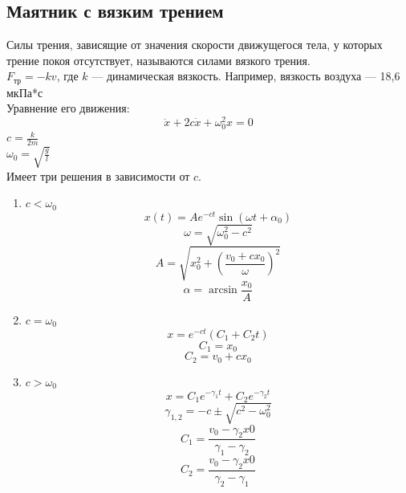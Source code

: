 \subsection*{Маятник с вязким трением}
Силы трения, зависящие от значения скорости движущегося тела, у которых трение покоя отсутствует, называются силами вязкого трения. \\
$F_{тр} = -kv$, где $k$ --- динамическая вязкость. Например, вязкость воздуха --- 18,6 мкПа*с \\
Уравнение его движения:
\begin{equation}
\ddot{x} + 2c\dot{x} + \omega_{0}^{2}x = 0
\end{equation}
$ c = \frac{k}{2m} $\\
$ \omega_{0} = \sqrt{\frac{g}{l}} $ \\
Имеет три решения в зависимости от $c$.
\begin{enumerate}
\item		$
			c < \omega_{0}
		$
		\begin{equation}
			x (t) = Ae^{-ct}\sin(\omega t + \alpha_0) 
		\end{equation}
		\begin{equation}
			\omega = \sqrt{\omega_{0}^{2} - c^2}
		\end{equation}
		\begin{equation}
			A = \sqrt{x_{0}^{2} + ({\frac{v_0 + cx_0}{\omega}})^{2}}
		\end{equation}
		\begin{equation}
			\alpha = \arcsin{\frac{x_0}{A}}
		\end{equation}
\item       
		$c = \omega_{0}$
		\begin{equation}
			x = e^{-ct}(C_1 + C_{2}t)
		\end{equation}
		\begin{equation}
			C_1 = x_0
		\end{equation}
		\begin{equation}
			C_2 = v_0 + cx_0
		\end{equation}
\item
		$
			c > \omega_{0}
		$
		\begin{equation}
			x = C_{1}e^{-\gamma_{1}t} + C_{2}e^{-\gamma_{2}t}
		\end{equation}
		\begin{equation}
			\gamma_{1,2} = -c \pm \sqrt{c^2 - \omega_{0}^{2}}
		\end{equation}
		\begin{equation}
			C_{1} = \frac{v_0 - \gamma_{2}x0}{\gamma_1 - \gamma_2}
		\end{equation}
		\begin{equation}
			C_{2} = \frac{v_0 - \gamma_{2}x0}{\gamma_2 - \gamma_1}
		\end{equation}
\end{enumerate}
